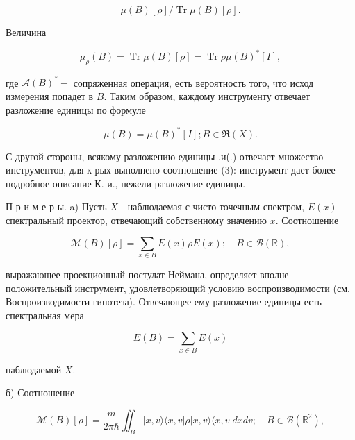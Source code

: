 \documentclass[10pt]{article}
\begin{document}
\[

\mathscr{\mu}(B)[\rho] / \operatorname{Tr} \mathscr{\mu}(B)[\rho] .

\]



Величина



\[

\mu_{\rho}(B)=\operatorname{Tr} \mu(B)[\rho]=\operatorname{Tr} \rho \mu(B)^{*}[I],

\]



где $\mathscr{A}(B)^{*}-$ сопряженная операция, есть вероятность того, что исход измерения попадет в $B$. Таким образом, каждому инструменту отвечает разложение единицы по формуле



\[

\mu(B)=\mu(B)^{*}[I] ; B \in \Re(X) .

\]



С другой стороны, всякому разложению единицы .и(.) отвечает множество инструментов, для к-рых выполнено соотношение (3): инструмент дает более подробное описание К. и., нежели разложение единицы.



П р и м е р ы. a) Пусть $X$ - наблюдаемая с чисто точечным спектром, $E(x)$ - спектральный проектор, отвечающий собственному значению $x$. Соотношение



\[

\mathscr{M}(B)[\rho]=\sum_{x \in B} E(x) \rho E(x) ; \quad B \in \mathscr{B}(\mathbb{R}),

\]



выражающее проекционный постулат Неймана, определяет вполне положительный инструмент, удовлетворяющий условию воспроизводимости (см. Воспроизводимости гипотеза). Отвечающее ему разложение единицы есть спектральная мера



\[

E(B)=\sum_{x \in B} E(x)

\]



наблюдаемой $X$.



б) Соотношение



\[

\mathscr{M}(B)[\rho]=\frac{m}{2 \pi \hbar} \iint_{B}|x, v\rangle\langle x, v|\rho| x, v\rangle\langle x, v| d x d v ; \quad B \in \mathscr{B}\left(\mathbb{R}^{2}\right),

\]
\end{document}
